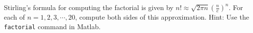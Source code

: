 {Stirling's formula for computing the factorial is given by $n! \approx \sqrt{2\pi n} \left(\displaystyle \frac{n}{e} \right)^n$.  For each of $n=1,2,3,\cdots, 20$, compute both sides of this approximation.  Hint: Use the \texttt{factorial} command in Matlab.}
{}
